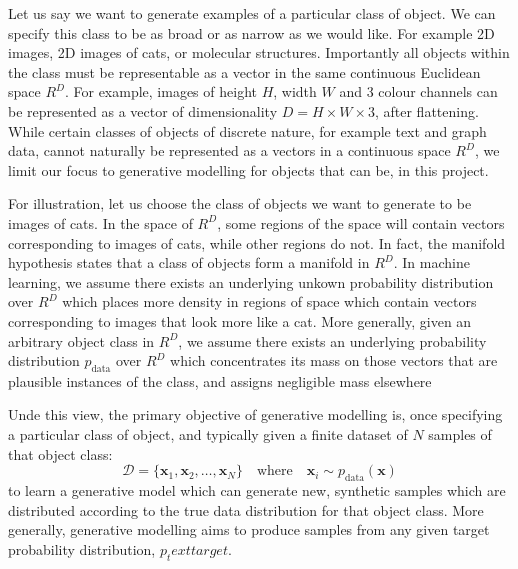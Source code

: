 \documentclass[12pt,a4paper]{report}
\begin{document}
Let us say we want to generate examples of a particular class of object. 
We can specify this class to be as broad or as narrow as we would like. 
For example 2D images, 2D images of cats, or molecular structures. 
Importantly all objects within the class must be representable as a vector in the same continuous Euclidean space $R^D$. 
For example, images of height $H$, width $W$ and 3 colour channels can be represented as a vector of dimensionality $D = H \times W \times 3$, after flattening. 
While certain classes of objects of discrete nature, for example text and graph data, cannot naturally be represented as a vectors in a continuous space $R^D$, we limit our focus to generative modelling for objects that can be, in this project. 

For illustration, let us choose the class of objects we want to generate to be images of cats.  
In the space of $R^D$, some regions of the space will contain vectors corresponding to images of cats, while other regions do not. 
In fact, the manifold hypothesis states that a class of objects form a manifold in $R^D$. 
In machine learning, we assume there exists an underlying unkown probability distribution over $R^D$ which places more density in regions of space which contain vectors corresponding to images that look more like a cat. 
More generally, given an arbitrary object class in $R^D$, we assume there exists an underlying probability distribution $p_\text{data}$ over $R^D$ which concentrates its mass on those vectors that are plausible instances of the class, and assigns negligible mass elsewhere

Unde this view, the primary objective of generative modelling is, once specifying a particular class of object, and typically given a finite dataset of $N$ samples of that object class:
$$\mathcal{D} = \{\mathbf{x}_1, \mathbf{x}_2, \dots, \mathbf{x}_N\} \quad \text{where} \quad \mathbf{x}_i \sim p_{\text{data}}(\mathbf{x})$$
to learn a generative model which can generate new, synthetic samples which are distributed according to the true data distribution for that object class. 
More generally, generative modelling aims to produce samples from any given target probability distribution, $p_text{target}$.
\end{document}
